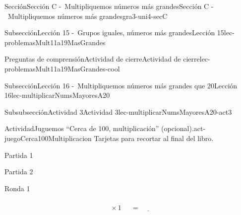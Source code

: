 \begin{sectionptx}{Sección}{Sección C -~Multipliquemos números más grandes}{}{Sección C -~Multipliquemos números más grandes}{}{}{gra3-uni4-secC}
\begin{subsectionptx}{Subsección}{Lección 15 -~Grupos iguales, números más grandes}{}{Lección 15}{}{}{lec-problemasMult11a19MasGrandes}
\begin{reading-questions-subsubsection-numberless}{Preguntas de comprensión}{Actividad de cierre}{}{Actividad de cierre}{}{}{lec-problemasMult11a19MasGrandes-cool}
\end{reading-questions-subsubsection-numberless}
\end{subsectionptx}
%
%
\typeout{************************************************}
\typeout{************************************************}
%
\begin{subsectionptx}{Subsección}{Lección 16 -~Multipliquemos números más grandes que 20}{}{Lección 16}{}{}{lec-multiplicarNumsMayoresA20}
%
%
\typeout{************************************************}
\typeout{************************************************}
%
\clearpage
\begin{subsubsectionptx}{Subsubsección}{Actividad 3}{}{Actividad 3}{}{}{lec-multiplicarNumsMayoresA20-act3}
\begin{activity}{Actividad}{Juguemos “Cerca de 100, multiplicación” (opcional).}{act-juegoCerca100Multiplicacion}%
Tarjetas para recortar al final del libro.
%
\begin{sidebyside}{2}{0}{0}{0.1}%
\begin{sbspanel}{0.45}%
\alert{Partida 1}%
\end{sbspanel}%
\begin{sbspanel}{0.45}%
\par
\alert{Partida 2}%
\end{sbspanel}%
\end{sidebyside}%
\begin{sidebyside}{2}{0}{0}{0.1}%
\begin{sbspanel}{0.45}%
Ronda 1%
\par
%
\begin{equation*}
\boxed{\phantom{\frac{00}{00}}} \times 1 \ \boxed{\phantom{\frac{00}{00}}}= \underline{\hspace{1cm}}

\end{equation*}
\end{sbspanel}
\end{sidebyside}
\end{activity}
\end{subsubsectionptx}
\end{subsectionptx}
\end{sectionptx}
